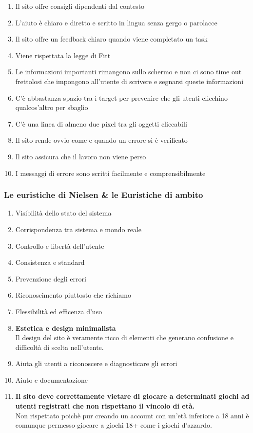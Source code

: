 \documentclass[../Report.tex]{subfiles}
\begin{document}
\begin{enumerate}
        \item Il sito offre consigli dipendenti dal contesto 
        \item L’aiuto è chiaro e diretto e scritto in lingua senza gergo o parolacce
        \item Il sito offre un feedback chiaro quando viene completato un task
        \item Viene rispettata la legge di Fitt
        \item Le informazioni importanti rimangono sullo schermo e non ci sono time out frettolosi che impongono all’utente di scrivere e segnarsi queste informazioni 
        \item C’è abbastanza spazio tra i target per prevenire che gli utenti clicchino qualcos’altro per sbaglio 
        \item C’è una linea di almeno due pixel tra gli oggetti cliccabili 
        \item Il sito rende ovvio come e quando un errore si è verificato 
        \item Il sito assicura che il lavoro non viene perso 
        \item I messaggi di errore sono scritti facilmente e comprensibilmente 
    \end{enumerate}

    \subsubsection{Le euristiche di Nielsen \& le Euristiche di ambito}
    \begin{enumerate}
        \item Visibilità dello stato del sistema 
        \item Corrispondenza tra sistema e mondo reale
        \item Controllo e libertà dell’utente 
        \item Consistenza e standard
        \item Prevenzione degli errori 
        \item Riconoscimento piuttosto che richiamo 
        \item Flessibilità ed efficenza d’uso 
        \item \textbf{Estetica e design minimalista}\\
        Il design del sito è veramente ricco di elementi che generano confusione e difficoltà di scelta nell’utente. 
        \item Aiuta gli utenti a riconoscere e diagnosticare gli errori 
        \item Aiuto e documentazione
        \item \textbf{Il sito deve correttamente vietare di giocare a determinati giochi ad utenti  registrati che non rispettano il vincolo di età.}\\
        Non rispettato poichè pur creando un account con un’età inferiore a 18 anni è comunque permesso giocare a giochi 18+ come i giochi d’azzardo.
    \end{enumerate}
\end{document}
